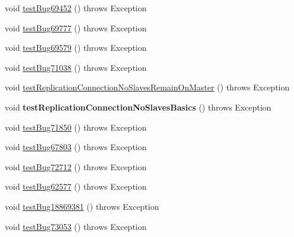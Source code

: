 \begin{DoxyCompactItemize}
\item 
void \mbox{\hyperlink{classtestsuite_1_1regression_1_1_connection_regression_test_a83cf8c588a6543301dab7d3afa57042b}{test\+Bug69452}} ()  throws Exception 
\item 
void \mbox{\hyperlink{classtestsuite_1_1regression_1_1_connection_regression_test_a6d62956aba90350317ed7d34d3d6eb39}{test\+Bug69777}} ()  throws Exception 
\item 
void \mbox{\hyperlink{classtestsuite_1_1regression_1_1_connection_regression_test_a09e5aef6835aa4e8cf07bde4c3d06a28}{test\+Bug69579}} ()  throws Exception 
\item 
void \mbox{\hyperlink{classtestsuite_1_1regression_1_1_connection_regression_test_af4f6635f25a74604468a8f9445e365ba}{test\+Bug71038}} ()  throws Exception 
\item 
void \mbox{\hyperlink{classtestsuite_1_1regression_1_1_connection_regression_test_a83ad61ca50bf84278212939dd4caff44}{test\+Replication\+Connection\+No\+Slaves\+Remain\+On\+Master}} ()  throws Exception 
\item 
\mbox{\label{classtestsuite_1_1regression_1_1_connection_regression_test_a0c251e168e357e7eeaa670fd0974ac70}} 
void {\bfseries test\+Replication\+Connection\+No\+Slaves\+Basics} ()  throws Exception 
\item 
void \mbox{\hyperlink{classtestsuite_1_1regression_1_1_connection_regression_test_a4b5713e8080de9926d1add37598cde58}{test\+Bug71850}} ()  throws Exception 
\item 
void \mbox{\hyperlink{classtestsuite_1_1regression_1_1_connection_regression_test_a4ac113ac44c3a4432d84e3a3c062da8f}{test\+Bug67803}} ()  throws Exception 
\item 
void \mbox{\hyperlink{classtestsuite_1_1regression_1_1_connection_regression_test_a5b26e8f9f7cdbfaf8bb96f0f4bf42f5d}{test\+Bug72712}} ()  throws Exception 
\item 
void \mbox{\hyperlink{classtestsuite_1_1regression_1_1_connection_regression_test_ae350fa13fa69dbd3f3a7e5b23ee15503}{test\+Bug62577}} ()  throws Exception 
\item 
void \mbox{\hyperlink{classtestsuite_1_1regression_1_1_connection_regression_test_a3a33e5e8b287fe162fdfc5ae872b7b4b}{test\+Bug18869381}} ()  throws Exception 
\item 
void \mbox{\hyperlink{classtestsuite_1_1regression_1_1_connection_regression_test_a264deb8ed8bb847ac786dbb4fd6ebb19}{test\+Bug73053}} ()  throws Exception 

\end{DoxyCompactItemize}
